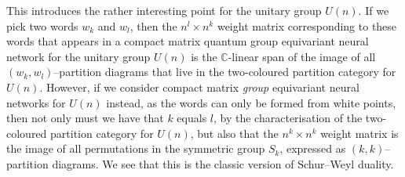 \documentclass{article}
\theoremstyle{plain}
\theoremstyle{definition}
\theoremstyle{remark}
\begin{document}
This introduces the rather interesting point for the unitary group $U(n)$.
If we pick two words $w_k$ and $w_l$, then the $n^l \times n^k$ weight matrix 
corresponding to these words
that appears in a
compact matrix quantum group equivariant neural network
for the unitary group $U(n)$ 
is the $\mathbb{C}$-linear span of the image of all
$(w_k, w_l)$--partition diagrams that live
in the two-coloured partition category for $U(n)$.
However, if we consider compact matrix \textit{group} equivariant neural networks for $U(n)$ instead,
as the words can only be formed from white points, 
then not only must we have that $k$ equals $l$,
by the characterisation of the two-coloured partition category for $U(n)$,
but also that
the $n^k \times n^k$ weight matrix is 
the image of all permutations in the symmetric group $S_k$, 
expressed as $(k,k)$--partition diagrams. 
We see that this is the classic version of Schur--Weyl duality.
\end{document}
